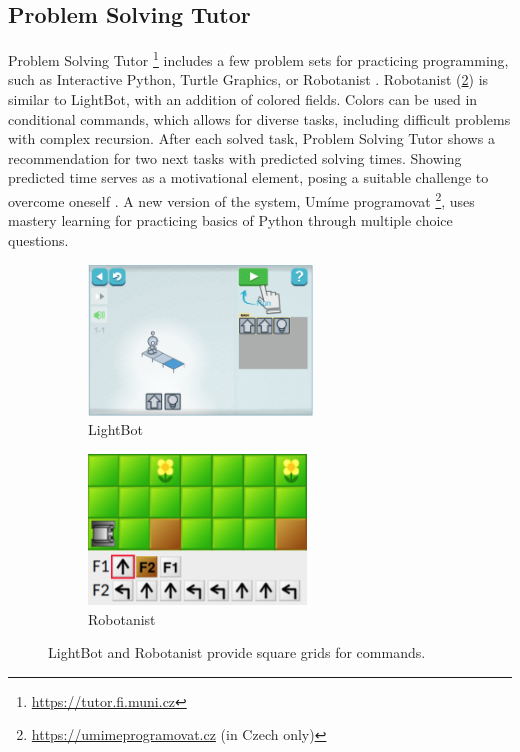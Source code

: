 \subsection{Problem Solving Tutor}
\label{sec:problem-solving-tutor}
Problem Solving Tutor%
\footnote{\url{https://tutor.fi.muni.cz}}
includes a few problem sets for practicing programming,
such as Interactive Python, Turtle Graphics, or Robotanist
\cite{proso}.
Robotanist (\cref{fig:robotanist}) is similar to LightBot,
with an addition of colored fields.
Colors can be used in conditional commands, which allows for diverse tasks,
including difficult problems with complex recursion.  After
each solved task, Problem Solving Tutor shows a recommendation for two next
tasks %
with predicted solving times.
Showing predicted time %
serves as a motivational element, posing
a suitable challenge to overcome oneself
\cite{pelanek-student-modeling-times}.
A new version of the system, Umíme programovat%
\footnote{\url{https://umimeprogramovat.cz} (in Czech only)},
uses mastery learning for practicing basics of Python through multiple choice questions.



\begin{figure}[htb]
\centering
\begin{subfigure}[t]{0.5\textwidth}
\centering
\includegraphics[height=4cm]{img/lightbot-instruction}
\caption{LightBot}
\label{fig:lightbot}
\end{subfigure}%
\begin{subfigure}[t]{0.5\textwidth}
\centering
\includegraphics[height=4cm]{img/robotanist}
\caption{Robotanist}
\label{fig:robotanist}
\end{subfigure}
\caption{LightBot and Robotanist provide square grids for commands.}
\label{fig:lightbot-robotanist}
\end{figure}



